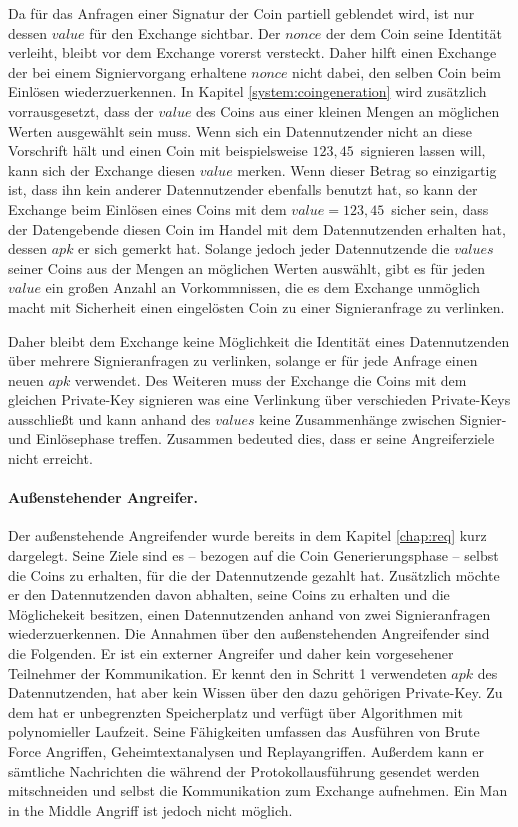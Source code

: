 \documentclass[
	fontsize=12pt,
	headings=small,
	parskip=half,           %
	bibliography=totoc,
	numbers=noenddot,       %
	open=any,               %
]{scrreprt}
\begin{document}
Da für das Anfragen einer Signatur der Coin partiell geblendet wird, ist nur dessen $value$ für den Exchange sichtbar. Der $nonce$ der dem Coin seine Identität verleiht, bleibt vor dem Exchange vorerst versteckt. Daher hilft einen Exchange der bei einem Signiervorgang erhaltene $nonce$ nicht dabei, den selben Coin beim Einlösen wiederzuerkennen. In Kapitel \ref{system:coingeneration} wird zusätzlich vorrausgesetzt, dass der $value$ des Coins aus einer kleinen Mengen an möglichen Werten ausgewählt sein muss. Wenn sich ein Datennutzender nicht an diese Vorschrift hält und einen Coin mit beispielsweise $123,45$\texteuro\ signieren lassen will, kann sich der Exchange diesen $value$ merken. Wenn dieser Betrag so einzigartig ist, dass ihn kein anderer Datennutzender ebenfalls benutzt hat, so kann der Exchange beim Einlösen eines Coins mit dem $value = 123,45$\texteuro\ sicher sein, dass der Datengebende diesen Coin im Handel mit dem Datennutzenden erhalten hat, dessen $apk$ er sich gemerkt hat. Solange jedoch jeder Datennutzende die $values$ seiner Coins aus der Mengen an möglichen Werten auswählt, gibt es für jeden $value$ ein großen Anzahl an Vorkommnissen, die es dem Exchange unmöglich macht mit Sicherheit einen eingelösten Coin zu einer Signieranfrage zu verlinken.

Daher bleibt dem Exchange keine Möglichkeit die Identität eines Datennutzenden über mehrere Signieranfragen zu verlinken, solange er für jede Anfrage einen neuen $apk$ verwendet. Des Weiteren muss der Exchange die Coins mit dem gleichen Private-Key signieren was eine Verlinkung über verschieden Private-Keys ausschließt und kann anhand des $values$ keine Zusammenhänge zwischen Signier- und Einlösephase treffen. Zusammen bedeuted dies, dass er seine Angreiferziele nicht erreicht.

\paragraph{Außenstehender Angreifer.} Der außenstehende Angreifender wurde bereits in dem Kapitel \ref{chap:req} kurz dargelegt. Seine Ziele sind es -- bezogen auf die Coin Generierungsphase -- selbst die Coins zu erhalten, für die der Datennutzende gezahlt hat. Zusätzlich möchte er den Datennutzenden davon abhalten, seine Coins zu erhalten und die Möglichekeit besitzen, einen Datennutzenden anhand von zwei Signieranfragen wiederzuerkennen. Die Annahmen über den außenstehenden Angreifender sind die Folgenden. Er ist ein externer Angreifer und daher kein vorgesehener Teilnehmer der Kommunikation. Er kennt den in Schritt 1 verwendeten $apk$ des Datennutzenden, hat aber kein Wissen über den dazu gehörigen Private-Key. Zu dem hat er unbegrenzten Speicherplatz und verfügt über Algorithmen mit polynomieller Laufzeit. Seine Fähigkeiten umfassen das Ausführen von Brute Force Angriffen, Geheimtextanalysen und Replayangriffen. Außerdem kann er sämtliche Nachrichten die während der Protokollausführung gesendet werden mitschneiden und selbst die Kommunikation zum Exchange aufnehmen. Ein Man in the Middle Angriff ist jedoch nicht möglich.\\
\end{document}
